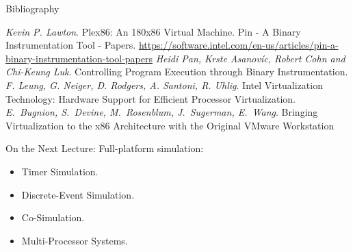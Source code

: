 \begin{frame}[allowframebreaks]{Bibliography}
\begin{thebibliography}{99}
\bibitem{} \textit{Kevin P. Lawton}. Plex86: An 180x86 Virtual Machine.
\bibitem{} Pin - A Binary Instrumentation Tool - Papers.
  \url{https://software.intel.com/en-us/articles/pin-a-binary-instrumentation-tool-papers}
\bibitem{} \textit{Heidi Pan, Krste Asanovíc, Robert Cohn and Chi-Keung Luk}.
  Controlling Program Execution through Binary Instrumentation.
\bibitem{} \textit{F. Leung, G. Neiger, D. Rodgers, A. Santoni, R. Uhlig}.
  Intel Virtualization Technology: Hardware Support for Efficient Processor
  Virtualization.
\bibitem{} \textit{E.~Bugnion, S.~Devine, M.~Rosenblum, J.~Sugerman, E.~Wang}.
  Bringing Virtualization to the x86 Architecture with the Original VMware
  Workstation
\end{thebibliography}
\end{frame}

\begin{frame}{On the Next Lecture:}
Full-platform simulation:
\begin{itemize}
\item Timer Simulation.
\item Discrete-Event Simulation.
\item Co-Simulation.
\item Multi-Processor Systems.
\end{itemize}
\end{frame}

\finalslide


